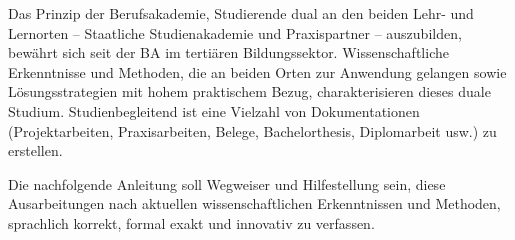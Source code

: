 Das Prinzip der Berufsakademie, Studierende dual an den beiden Lehr- und Lernorten – Staatliche Studienakademie und Praxispartner – auszubilden, bewährt sich seit der \ac{BA} im tertiären Bildungssektor. Wissenschaftliche Erkenntnisse und Methoden, die an beiden Orten zur Anwendung gelangen sowie Lösungsstrategien mit hohem praktischem Bezug, charakterisieren dieses duale Studium. Studienbegleitend ist eine Vielzahl von Dokumentationen (Projektarbeiten, Praxisarbeiten, Belege, Bachelorthesis, Diplomarbeit usw.) zu erstellen.

Die nachfolgende Anleitung soll Wegweiser und Hilfestellung sein, diese Ausarbeitungen nach aktuellen wissenschaftlichen Erkenntnissen und Methoden, sprachlich korrekt, formal exakt und innovativ zu verfassen.
